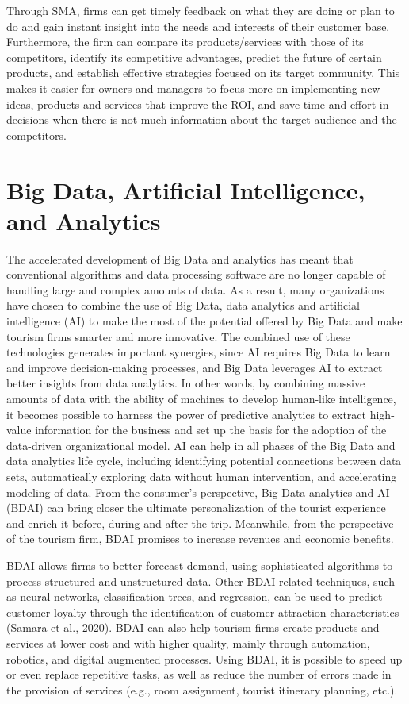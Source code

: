 \documentclass[
  letterpaper,
  DIV=11,
  numbers=noendperiod]{scrreprt}
\begin{document}
Through SMA, firms can get timely feedback on what they are doing or
plan to do and gain instant insight into the needs and interests of
their customer base. Furthermore, the firm can compare its
products/services with those of its competitors, identify its
competitive advantages, predict the future of certain products, and
establish effective strategies focused on its target community. This
makes it easier for owners and managers to focus more on implementing
new ideas, products and services that improve the ROI, and save time and
effort in decisions when there is not much information about the target
audience and the competitors.

\hypertarget{big-data-artificial-intelligence-and-analytics}{%
\section{Big Data, Artificial Intelligence, and
Analytics}\label{big-data-artificial-intelligence-and-analytics}}

The accelerated development of Big Data and analytics has meant that
conventional algorithms and data processing software are no longer
capable of handling large and complex amounts of data. As a result, many
organizations have chosen to combine the use of Big Data, data analytics
and artificial intelligence (AI) to make the most of the potential
offered by Big Data and make tourism firms smarter and more innovative.
The combined use of these technologies generates important synergies,
since AI requires Big Data to learn and improve decision-making
processes, and Big Data leverages AI to extract better insights from
data analytics. In other words, by combining massive amounts of data
with the ability of machines to develop human-like intelligence, it
becomes possible to harness the power of predictive analytics to extract
high-value information for the business and set up the basis for the
adoption of the data-driven organizational model. AI can help in all
phases of the Big Data and data analytics life cycle, including
identifying potential connections between data sets, automatically
exploring data without human intervention, and accelerating modeling of
data. From the consumer's perspective, Big Data analytics and AI (BDAI)
can bring closer the ultimate personalization of the tourist experience
and enrich it before, during and after the trip. Meanwhile, from the
perspective of the tourism firm, BDAI promises to increase revenues and
economic benefits.

BDAI allows firms to better forecast demand, using sophisticated
algorithms to process structured and unstructured data. Other
BDAI-related techniques, such as neural networks, classification trees,
and regression, can be used to predict customer loyalty through the
identification of customer attraction characteristics (Samara et al.,
2020). BDAI can also help tourism firms create products and services at
lower cost and with higher quality, mainly through automation, robotics,
and digital augmented processes. Using BDAI, it is possible to speed up
or even replace repetitive tasks, as well as reduce the number of errors
made in the provision of services (e.g., room assignment, tourist
itinerary planning, etc.).
\end{document}
